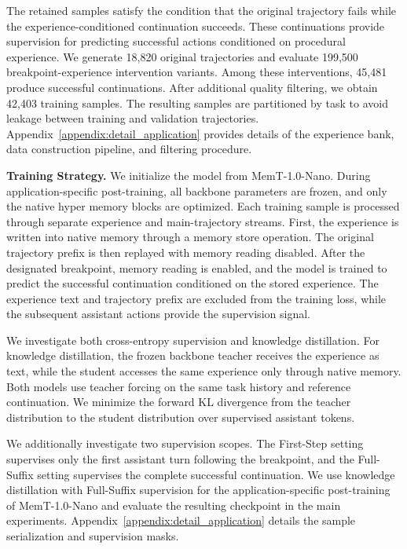 The retained samples satisfy the condition that the original trajectory fails while the experience-conditioned continuation succeeds. These continuations provide supervision for predicting successful actions conditioned on procedural experience. We generate 18,820 original trajectories and evaluate 199,500 breakpoint-experience intervention variants. Among these interventions, 45,481 produce successful continuations. After additional quality filtering, we obtain 42,403 training samples. The resulting samples are partitioned by task to avoid leakage between training and validation trajectories. Appendix~\ref{appendix:detail_application} provides details of the experience bank, data construction pipeline, and filtering procedure.


\textbf{Training Strategy.}
We initialize the model from MemT-1.0-Nano. During application-specific post-training, all backbone parameters are frozen, and only the native hyper memory blocks are optimized. Each training sample is processed through separate experience and main-trajectory streams. First, the experience is written into native memory through a memory store operation. The original trajectory prefix is then replayed with memory reading disabled. After the designated breakpoint, memory reading is enabled, and the model is trained to predict the successful continuation conditioned on the stored experience. The experience text and trajectory prefix are excluded from the training loss, while the subsequent assistant actions provide the supervision signal.

We investigate both cross-entropy supervision and knowledge distillation. For knowledge distillation, the frozen backbone teacher receives the experience as text, while the student accesses the same experience only through native memory. Both models use teacher forcing on the same task history and reference continuation. We minimize the forward KL divergence from the teacher distribution to the student distribution over supervised assistant tokens.

We additionally investigate two supervision scopes.
The First-Step setting supervises only the first assistant turn following the breakpoint, and the Full-Suffix setting supervises the complete successful continuation. We use knowledge distillation with Full-Suffix supervision for the application-specific post-training of MemT-1.0-Nano and evaluate the resulting checkpoint in the main experiments. Appendix~\ref{appendix:detail_application} details the sample serialization and supervision masks.

